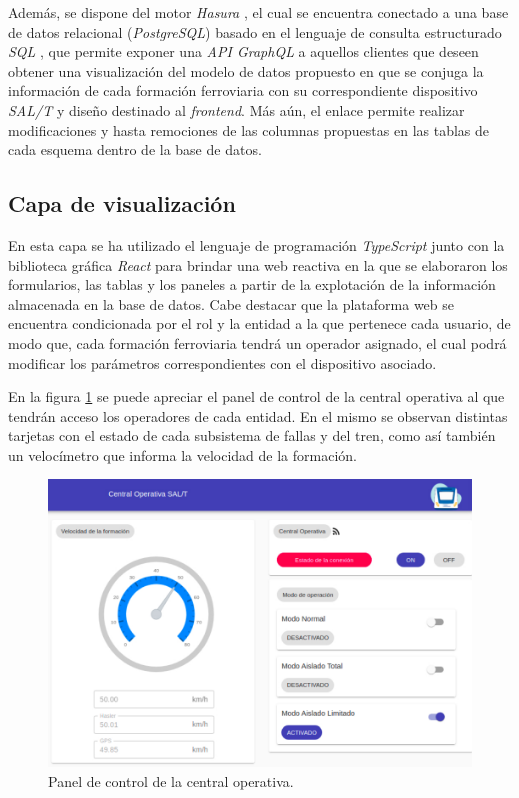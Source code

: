 Además, se dispone del motor \textit{Hasura} \cite{b16}, el cual se encuentra conectado a una base de datos relacional (\textit{PostgreSQL}) basado en el lenguaje de consulta estructurado \textit{SQL} \cite{b17}, que permite exponer una \textit{API GraphQL} \cite{b18} a aquellos clientes que deseen obtener una visualización del modelo de datos propuesto en que se conjuga la información de cada formación ferroviaria con su correspondiente dispositivo \textit{SAL/T} y diseño destinado al \textit{frontend}. Más aún, el enlace permite realizar modificaciones y hasta remociones de las columnas propuestas en las tablas de cada esquema dentro de la base de datos.


\subsection{Capa de visualización}

  En esta capa se ha utilizado el lenguaje de programación \textit{TypeScript} \cite{b19} junto con la biblioteca gráfica \textit{React} \cite{b20} para brindar una web reactiva en la que se elaboraron los formularios, las tablas y los paneles a partir de la explotación de la información almacenada en la base de datos. Cabe destacar que la plataforma web se encuentra condicionada por el rol y la entidad a la que pertenece cada usuario, de modo que, cada formación ferroviaria tendrá un operador asignado, el cual podrá modificar los parámetros correspondientes con el dispositivo asociado.

En la figura \ref{fig:dashboard} se puede apreciar el panel de control de la central operativa al que tendrán acceso los operadores de cada entidad.
En el mismo se observan distintas tarjetas con el estado de cada subsistema de fallas y del tren, como así también un velocímetro que
informa la velocidad de la formación.

\begin{figure}[ht]
\centering 
\includegraphics[width=.48\textwidth]{images/v2.1.0/dashboard.jpg}
\caption{Panel de control de la central operativa.}
\label{fig:dashboard}
\end{figure}
